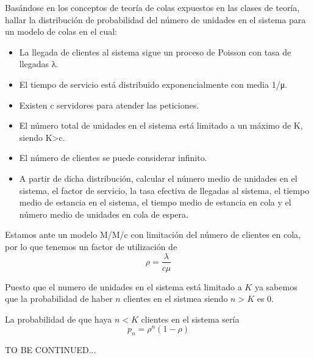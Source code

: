 
\begin{problem}[14]
Basándose en los conceptos de teoría de colas expuestos en las clases de teoría, hallar la distribución de probabilidad del número de unidades en el sistema para un modelo de colas en el cual:
\begin{itemize}
\item La llegada de clientes al sistema sigue un proceso de Poisson con tasa de llegadas λ.
\item El tiempo de servicio está distribuido exponencialmente con media 1/μ.
\item Existen c servidores para atender las peticiones.
\item El número total de unidades en el sistema está limitado a un máximo de K, siendo K>c.
\item El número de clientes se puede considerar infinito.
\item A partir de dicha distribución, calcular el número medio de unidades en el sistema, el factor de servicio, la tasa efectiva de llegadas al sistema, el tiempo medio de estancia en el sistema, el tiempo medio de estancia en cola y el número medio de unidades en cola de espera.
\end{itemize}
\solution

Estamos ante un modelo M/M/c con limitación del número de clientes en cola, por lo que tenemos un factor de utilización de
\[ρ=\frac{λ}{cμ}\]

Puesto que el numero de unidades en el sistema está limitado a $K$ ya sabemos que la probabilidad de haber $n$ clientes en el sistmea siendo $n>K$ es 0.

La probabilidad de que haya $n<K$ clientes en el sistema sería
\[p_n=ρ^n(1-ρ)\]

TO BE CONTINUED...

\end{problem}

